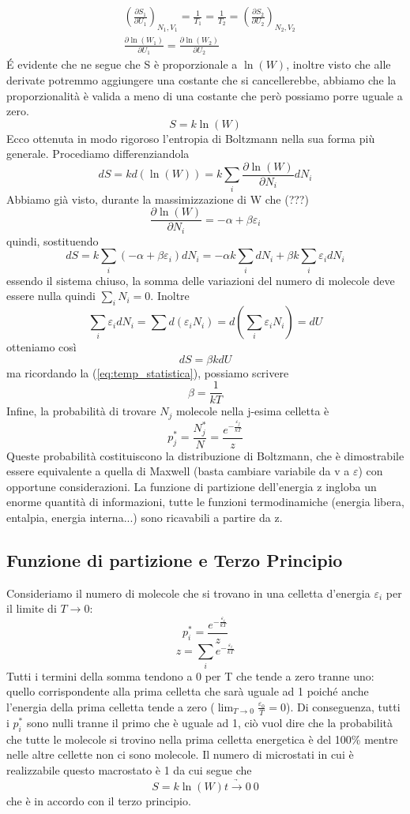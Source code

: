 \documentclass[10pt,a4paper]{article}
\begin{document}
\begin{align*}
	&\left(\frac{\partial S_1}{\partial U_1}\right)_{N_1, V_1} = \frac{1}{T_1} = \frac{1}{T_2} = \left(\frac{\partial S_2}{\partial U_2}\right)_{N_2, V_2}\\
	&\frac{\partial \ln(W_1)}{\partial U_1} = \frac{\partial \ln(W_2)}{\partial U_2}
\end{align*}
\'{E} evidente che ne segue che S è proporzionale a \(\ln(W)\), inoltre visto che alle derivate potremmo aggiungere una costante che si cancellerebbe, abbiamo che la proporzionalità è valida a meno di una costante che però possiamo porre uguale a zero.
\[S = k\ln(W)\] 
Ecco ottenuta in modo rigoroso l'entropia di Boltzmann nella sua forma più generale. Procediamo differenziandola
\[dS = kd(\ln(W)) = k\sum_i \frac{\partial \ln(W)}{\partial N_i}dN_i\]
Abbiamo già visto, durante la massimizzazione di W che (???)
\[\frac{\partial \ln(W)}{\partial N_i} = -\alpha+\beta\varepsilon_i\]
quindi, sostituendo
\[dS = k\sum_i(-\alpha+\beta\varepsilon_i)dN_i = -\alpha k\sum_idN_i+\beta k \sum_i\varepsilon_idN_i\]
essendo il sistema chiuso, la somma delle variazioni del numero di molecole deve essere nulla quindi \(\sum_iN_i =0\). Inoltre
 \[\sum_i\varepsilon_idN_i = \sum d(\varepsilon_i N_i) = d(\sum_i\varepsilon_i N_i) = dU\]
otteniamo così 
\[dS = \beta k dU\]
ma ricordando la (\ref{eq:temp_statistica}), possiamo scrivere
\[\beta = \frac{1}{kT}\]
Infine, la probabilità di trovare \(N_j\) molecole nella j-esima celletta è 
\[p_j^* = \frac{N_j^*}{N}=\frac{e^{-\frac{\varepsilon_j}{kT}}}{z}\]
Queste probabilità costituiscono la distribuzione di Boltzmann, che è dimostrabile essere equivalente a quella di Maxwell (basta cambiare variabile da v a $\varepsilon$) con opportune considerazioni. La funzione di partizione dell'energia z ingloba un enorme quantità di informazioni, tutte le funzioni termodinamiche (energia libera, entalpia, energia interna...) sono ricavabili a partire da z. 
\subsection{Funzione di partizione e Terzo Principio}
Consideriamo il numero di molecole che si trovano in una celletta d'energia $\varepsilon_i$ per il limite di \(T\to 0\):
\[p_i^*= \frac{e^{-\frac{\varepsilon_i}{kT}}}{z}\]
\[z=\sum_ie^{-\frac{\varepsilon_i}{kT}}\]
Tutti i termini della somma tendono a 0 per T che tende a zero tranne uno: quello corrispondente alla prima celletta che sarà uguale ad 1 poiché anche l'energia della prima celletta tende a zero ($\lim_{T\to 0}\frac{\varepsilon_0}{T}=0$). Di conseguenza, tutti i \(p_i^*\) sono nulli tranne il primo che è uguale ad 1, ciò vuol dire che la probabilità che tutte le molecole si trovino nella prima celletta energetica è del 100\% mentre nelle altre cellette non ci sono molecole. Il numero di microstati in cui è realizzabile questo macrostato è 1 da cui segue che 
\[S=k\ln(W)\underrightarrow{t\to0}\ 0\]
che è in accordo con il terzo principio. 
\end{document}
